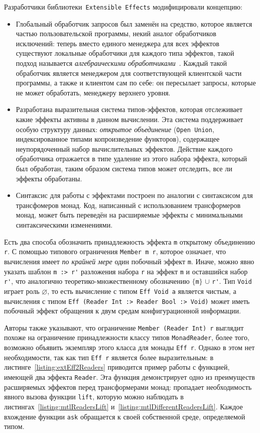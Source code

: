 Разработчики библиотеки~\lstinline{Extensible Effects} модифицировали концепцию:

\begin{itemize}
  \item
Глобальный обработчик запросов был заменён на средство, которое является частью 
пользовательской программы, некий аналог обработчиков исключений: теперь вместо 
единого менеджера для всех эффектов существуют локальные обработчики для каждого 
типа эффектов, такой подход называется \emph{алгебраическими
обработчиками}~\cite{effAndHandl}. Каждый такой обработчик является менеджером 
для соответствующей клиентской части программы, а также и клиентом сам по себе: 
он пересылает запросы, которые не может обработать, менеджеру верхнего уровня.
  \item
Разработана выразительная система типов-эффектов, которая отслеживает какие 
эффекты активны в данном вычислении. Эта система поддерживает особую структуру 
данных: \emph{открытое объединение} (\lstinline{Open Union}, индексированное 
типами копроизведение функторов), содержащее неупорядоченный набор 
вычислительных эффектов. Действие каждого обработчика отражается в типе удаление
из этого набора эффекта, который был обработан, таким образом система типов 
может отследить, все ли эффекты обработаны.
  \item
Синтаксис для работы с эффектами построен по аналогии с синтаксисом для 
трансфомеров монад. Код, написанный с использованием трансформеров монад, 
может быть переведён на расширяемые эффекты с минимальными синтаксическими 
изменениями.
\end{itemize}

Есть два способа обозначить принадлежность эффекта \lstinline{m} открытому 
объединению \lstinline{r}. С помощью типового ограничения 
\mbox{\lstinline{Member m r},} которое означает, что вычисления имеет 
\emph{по крайней мере} один побочный эффект \lstinline{m}. Иначе, можно явно 
указать шаблон \lstinline{m :> r'} разложения набора \lstinline{r} на 
эффект \lstinline{m} и оставшийся набор \lstinline{r'}, что аналогично 
теоретико-множественному обозначению $\{$\lstinline{m}$\}$ $\cup$ 
\lstinline{r'}. Тип \lstinline{Void} играет роль $\varnothing$, то есть 
вычисление с типом \lstinline{Eff Void a} является чистым, а вычисления с 
типом \lstinline{Eff (Reader Int :> Reader Bool :> Void)} может иметь побочный 
эффект обращения к двум средам конфигурационной информации.

Авторы также указывают, что ограничение 
\mbox{\lstinline{Member (Reader Int) r}} выглядит похоже на ограничение 
принадлежности классу типов \lstinline{MonadReader}, более того, возможно 
объявить экземпляр этого класса для монады \lstinline{Eff r}. Однако в этом нет
необходимости, так как тип \lstinline{Eff r} является более выразительным: 
в листинге~\ref{listing:extEff2Readers} приводится пример работы с функцией, 
имеющей два эффекта \lstinline{Reader}. Эта функция демонстрирует одно из 
преимуществ расширяемых эффектов перед трансформерами монад: пропадает 
необходимость явного вызова функции \lstinline{lift}, которую можно наблюдать 
в листингах~\ref{listing:mtlReadersLift} 
и~\ref{listing:mtlDifferentReadersLift}. Каждое вхождение функции 
\lstinline{ask} обращается к своей собственной среде, определяемой типом.

